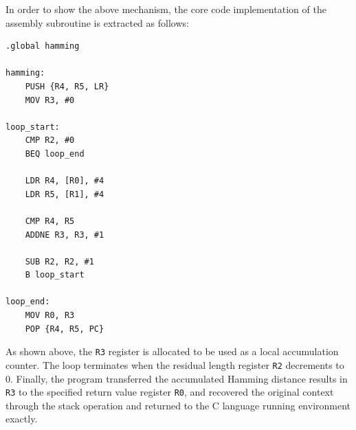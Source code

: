 In order to show the above mechanism, the core code implementation of the assembly subroutine is extracted as follows:

\begin{verbatim}
.global hamming
	
hamming:
    PUSH {R4, R5, LR}
    MOV R3, #0

loop_start:
    CMP R2, #0
    BEQ loop_end

    LDR R4, [R0], #4
    LDR R5, [R1], #4

    CMP R4, R5
    ADDNE R3, R3, #1

    SUB R2, R2, #1
    B loop_start

loop_end:
    MOV R0, R3
    POP {R4, R5, PC}
\end{verbatim}

As shown above, the \texttt{R3} register is allocated to be used as a local accumulation counter. The loop terminates when the residual length register \texttt{R2} decrements to 0. Finally, the program transferred the accumulated Hamming distance results in \texttt{R3} to the specified return value register \texttt{R0}, and recovered the original context through the stack operation and returned to the C language running environment exactly. 
